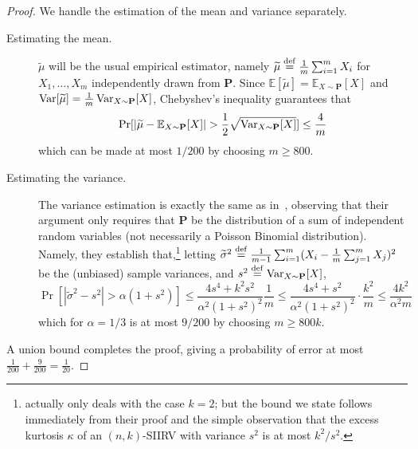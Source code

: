 \documentclass[11pt]{article}
\theoremstyle{definition}
\newcommand{\E}{\mathbb{E}}
\newcommand{\p}{\mathbf{P}}
\newcommand{\abs}[1]{\lvert#1\rvert}
\newcommand{\Var}{\mathop{\textnormal{Var}}\nolimits}
\newcommand{\eqdef}{\stackrel{{\mathrm {\footnotesize def}}}{=}}
\renewcommand{\abs}[1]{\left\lvert #1 \right\rvert}
\begin{document}
\begin{proof}We handle the estimation of the mean and variance separately.
\begin{description}
  \item[Estimating the mean.] $\widetilde{\mu}$ will be the usual empirical estimator, namely $\widetilde{\mu} \eqdef \frac{1}{m}\sum_{i=1}^m X_i$ for $X_1,\dots,X_m$ independently drawn from $\p$. Since $\E[\widetilde{\mu}]=\E_{X \sim \p}[X]$ and $\Var[\widetilde{\mu}]= \frac{1}{m}\Var_{X \sim \p}[X]$, Chebyshev's inequality guarantees that
  \[
      \Pr[ \abs{ \widetilde{\mu} - \E_{X \sim \p}[X] } >  \frac{1}{2}\sqrt{\Var_{X \sim \p}[X]}] \leq \frac{4}{m}
  \]
  which can be made at most $1/200$ by choosing $m\geq 800$.
  \item[Estimating the variance.] The variance estimation is exactly the same as in~\cite[Lemma 6]{DDS15-journal}, observing that their argument only requires that $\p$ be the distribution of a sum of independent random variables (not necessarily a Poisson Binomial distribution). Namely, they establish that,\footnote{\cite[Lemma 6]{DDS15-journal} actually only deals with the case $k=2$; but the bound we state follows immediately from their proof and the simple observation that the excess kurtosis $\kappa$ of an $(n,k)$-SIIRV with variance $s^2$ is at most ${k^2}/{s^2}$.} letting $\widetilde{\sigma}^2\eqdef\frac{1}{m-1}\sum_{i=1}^m (X_i-\frac{1}{m}\sum_{j=1}^m X_j)^2$ be the (unbiased) sample variances, and $s^2\eqdef \Var_{X \sim \p}[X]$,
   \[
       \Pr[ \abs{ \widetilde{\sigma}^2 - s^2 } > \alpha(1+s^2) ] \leq \frac{4s^4+k^2s^2}{\alpha^2(1+s^2)^2} \frac{1}{m}
       \leq \frac{4s^4+s^2}{\alpha^2(1+s^2)^2}\cdot  \frac{k^2}{m} \leq \frac{4k^2}{\alpha^2m}
   \]
   which for $\alpha=1/3$ is at most $9/200$ by choosing $m\geq 800k$.
\end{description}
A union bound completes the proof, giving a probability of error at most $\frac{1}{200}+\frac{9}{200}=\frac{1}{20}$.
\end{proof}
\end{document}
